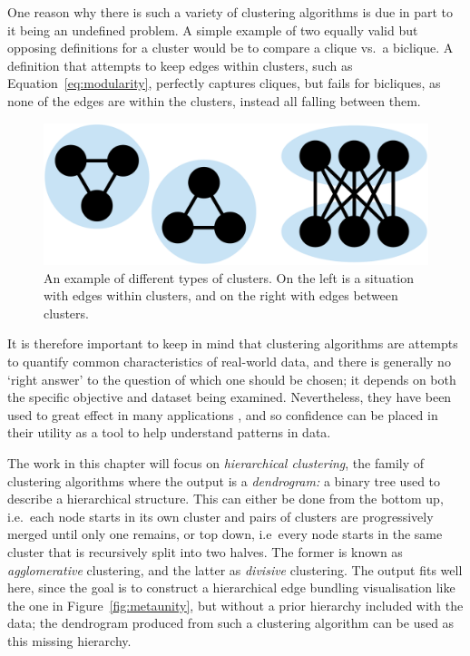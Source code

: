 One reason why there is such a variety of clustering algorithms is due in part to it being an undefined problem. A simple example of two equally valid but opposing definitions for a cluster would be to compare a clique vs.\ a biclique. A definition that attempts to keep edges within clusters, such as Equation~\ref{eq:modularity}, perfectly captures cliques, but fails for bicliques, as none of the edges are within the clusters, instead all falling between them.
\begin{figure}
  \centering
  \includegraphics[width=.8\textwidth]{power/clique_vs_biclique.pdf}
  \caption[Two examples for why clustering is difficult to define]{An example of different types of clusters. On the left is a situation with edges within clusters, and on the right with edges between clusters.}
  \label{fig:clique_vs_biclique}
\end{figure}
It is therefore important to keep in mind that clustering algorithms are attempts to quantify common characteristics of real-world data, and there is generally no `right answer' to the question of which one should be chosen; it depends on both the specific objective and dataset being examined. 
Nevertheless, they have been used to great effect in many applications \citep{Fortunato2016}, and so confidence can be placed in their utility as a tool to help understand patterns in data.

The work in this chapter will focus on \emph{hierarchical clustering}, the family of clustering algorithms where the output is a \textit{dendrogram:} a binary tree used to describe a hierarchical structure.
This can either be done from the bottom up, i.e.\ each node starts in its own cluster and pairs of clusters are progressively merged until only one remains, or top down, i.e\ every node starts in the same cluster that is recursively split into two halves. The former is known as \emph{agglomerative} clustering, and the latter as \emph{divisive} clustering.
The output fits well here, since the goal is to construct a hierarchical edge bundling visualisation like the one in Figure~\ref{fig:metaunity}, but without a prior hierarchy included with the data; the dendrogram produced from such a clustering algorithm can be used as this missing hierarchy.

